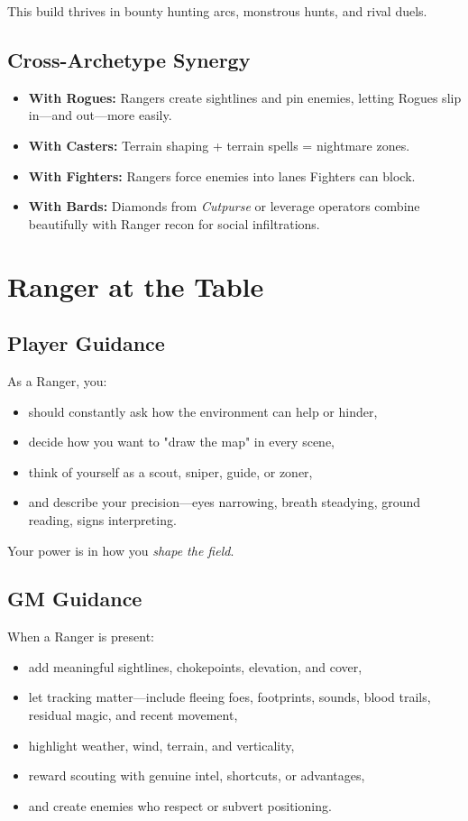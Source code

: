 \documentclass[11pt]{book}
\begin{document}
This build thrives in bounty hunting arcs, monstrous hunts, and rival duels.

\subsection{Cross-Archetype Synergy}

\begin{itemize}
  \item \textbf{With Rogues:} Rangers create sightlines and pin enemies,
        letting Rogues slip in---and out---more easily.
  \item \textbf{With Casters:} Terrain shaping + terrain spells = nightmare zones.
  \item \textbf{With Fighters:} Rangers force enemies into lanes Fighters can block.
  \item \textbf{With Bards:} Diamonds from \emph{Cutpurse} or leverage operators
        combine beautifully with Ranger recon for social infiltrations.
\end{itemize}

\section{Ranger at the Table}

\subsection{Player Guidance}

As a Ranger, you:
\begin{itemize}
  \item should constantly ask how the environment can help or hinder,
  \item decide how you want to "draw the map" in every scene,
  \item think of yourself as a scout, sniper, guide, or zoner,
  \item and describe your precision---eyes narrowing, breath steadying,
        ground reading, signs interpreting.
\end{itemize}

Your power is in how you \emph{shape the field}.

\subsection{GM Guidance}

When a Ranger is present:
\begin{itemize}
  \item add meaningful sightlines, chokepoints, elevation, and cover,
  \item let tracking matter---include fleeing foes, footprints, sounds,
        blood trails, residual magic, and recent movement,
  \item highlight weather, wind, terrain, and verticality,
  \item reward scouting with genuine intel, shortcuts, or advantages,
  \item and create enemies who respect or subvert positioning.
\end{itemize}
\end{document}
